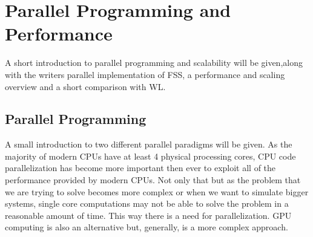 \chapter{Parallel Programming and Performance}

	A short introduction to parallel programming and scalability will be given,along with the writers parallel implementation of FSS, a performance and scaling overview and a short comparison with WL.

\section{Parallel Programming}

		A small introduction to two different parallel paradigms will be given. As the majority of modern CPUs have at least 4 physical processing cores, CPU code parallelization has become more important then ever to exploit all of the performance provided by modern CPUs. Not only that but as the problem that we are trying to solve becomes more complex or when we want to simulate bigger systems, single core computations may not be able to solve the problem in a reasonable amount of time. This way there is a need for parallelization. GPU computing is also an alternative but, generally, is a more complex approach.


